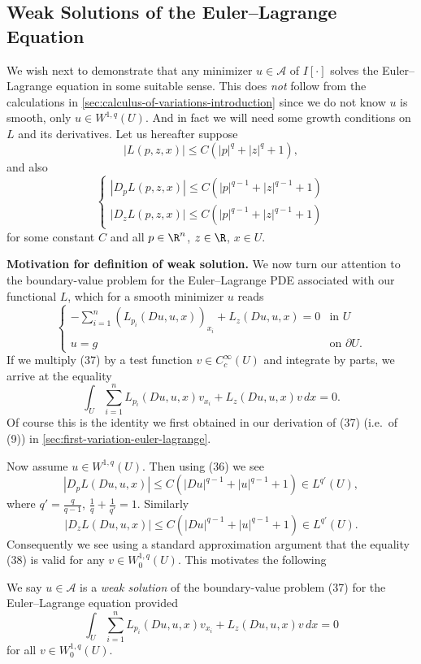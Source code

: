 \subsection{Weak Solutions of the Euler--Lagrange Equation}
\label{sec:euler-lagrange-equation-weak-solutions}

We wish next to demonstrate that any minimizer $u \in \mathcal{A}$ of $I[\cdot]$ solves the Euler--Lagrange equation in some suitable sense. This does \textit{not} follow from the calculations in \cref{sec:calculus-of-variations-introduction} since we do not know $u$ is smooth, only $u \in W^{1,q}(U)$. And in fact we will need some growth conditions on $L$ and its derivatives. Let us hereafter suppose
\[
|L(p, z, x)| \le C(|p|^q + |z|^q + 1),
\tag{35}
\]
and also
\[
\begin{cases}
|D_pL(p,z,x)| \le C(|p|^{q-1} + |z|^{q-1} + 1) \\
|D_zL(p,z,x)| \le C(|p|^{q-1} + |z|^{q-1} + 1)
\end{cases}
\tag{36}
\]
for some constant $C$ and all $p \in \R^n$, $z \in \R$, $x \in U$.

\noindent\textbf{Motivation for definition of weak solution.} We now turn our attention to the boundary-value problem for the Euler--Lagrange PDE associated with our functional $L$, which for a smooth minimizer $u$ reads
\[
\begin{cases}
-\sum_{i=1}^n(L_{p_i}(Du,u,x))_{x_i} + L_z(Du,u,x) = 0 & \text{in } U \\
u = g & \text{on } \partial U.
\end{cases}
\tag{37}
\]
If we multiply (37) by a test function $v \in C_c^\infty(U)$ and integrate by parts, we arrive at the equality
\[
\int_U \sum_{i=1}^n L_{p_i}(Du,u,x)v_{x_i} + L_z(Du,u,x)v \, dx = 0.
\tag{38}
\]
Of course this is the identity we first obtained in our derivation of (37) (i.e.\ of (9)) in \cref{sec:first-variation-euler-lagrange}.

Now assume $u \in W^{1,q}(U)$. Then using (36) we see
\[
|D_pL(Du,u,x)| \le C(|Du|^{q-1} + |u|^{q-1}+1) \in L^{q'}(U),
\]
where $q' = \frac{q}{q-1}$, $\frac1q+\frac1{q'}=1$. Similarly
\[
|D_zL(Du,u,x)| \le C(|Du|^{q-1}+|u|^{q-1}+1) \in L^{q'}(U).
\tag{39}
\]
Consequently we see using a standard approximation argument that the equality (38) is valid for any $v \in W_0^{1,q}(U)$. This motivates the following

\begin{definition}
\label{def:weak-solution-euler-lagrange-scalar}
We say $u \in \mathcal{A}$ is a \textit{weak solution} of the boundary-value problem (37) for the Euler--Lagrange equation provided
\[
\int_U \sum_{i=1}^n L_{p_i}(Du,u,x) v_{x_i} + L_z(Du,u,x) v \, dx = 0
\]
for all $v \in W_0^{1,q}(U)$.
\end{definition}

